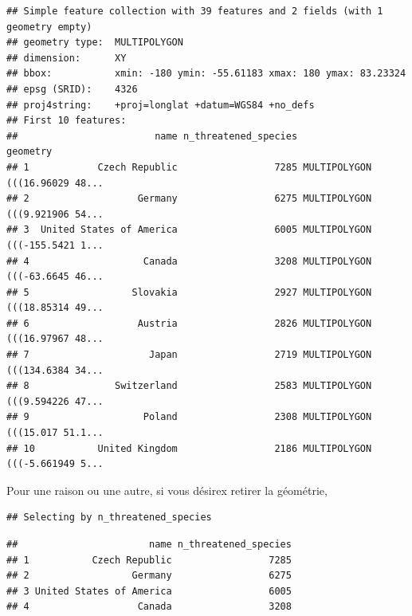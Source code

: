 \documentclass[]{book}
\newenvironment{Shaded}{\begin{snugshade}}{\end{snugshade}}
\newcommand{\DecValTok}[1]{\textcolor[rgb]{0.00,0.00,0.81}{#1}}
\newcommand{\KeywordTok}[1]{\textcolor[rgb]{0.13,0.29,0.53}{\textbf{#1}}}
\newcommand{\NormalTok}[1]{#1}
\newcommand{\OperatorTok}[1]{\textcolor[rgb]{0.81,0.36,0.00}{\textbf{#1}}}
\newcommand{\OtherTok}[1]{\textcolor[rgb]{0.56,0.35,0.01}{#1}}
\newcommand{\StringTok}[1]{\textcolor[rgb]{0.31,0.60,0.02}{#1}}
\begin{document}
\begin{verbatim}
## Simple feature collection with 39 features and 2 fields (with 1 geometry empty)
## geometry type:  MULTIPOLYGON
## dimension:      XY
## bbox:           xmin: -180 ymin: -55.61183 xmax: 180 ymax: 83.23324
## epsg (SRID):    4326
## proj4string:    +proj=longlat +datum=WGS84 +no_defs
## First 10 features:
##                        name n_threatened_species                       geometry
## 1            Czech Republic                 7285 MULTIPOLYGON (((16.96029 48...
## 2                   Germany                 6275 MULTIPOLYGON (((9.921906 54...
## 3  United States of America                 6005 MULTIPOLYGON (((-155.5421 1...
## 4                    Canada                 3208 MULTIPOLYGON (((-63.6645 46...
## 5                  Slovakia                 2927 MULTIPOLYGON (((18.85314 49...
## 6                   Austria                 2826 MULTIPOLYGON (((16.97967 48...
## 7                     Japan                 2719 MULTIPOLYGON (((134.6384 34...
## 8               Switzerland                 2583 MULTIPOLYGON (((9.594226 47...
## 9                    Poland                 2308 MULTIPOLYGON (((15.017 51.1...
## 10           United Kingdom                 2186 MULTIPOLYGON (((-5.661949 5...
\end{verbatim}

Pour une raison ou une autre, si vous désirex retirer la géométrie,

\begin{Shaded}
\end{Shaded}

\begin{verbatim}
## Selecting by n_threatened_species
\end{verbatim}

\begin{verbatim}
##                       name n_threatened_species
## 1           Czech Republic                 7285
## 2                  Germany                 6275
## 3 United States of America                 6005
## 4                   Canada                 3208
\end{verbatim}
\end{document}
